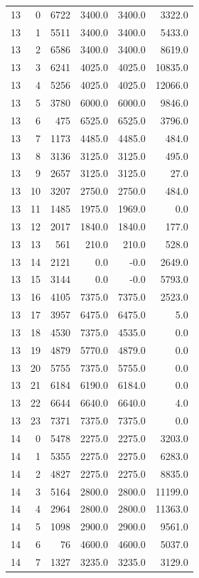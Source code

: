 \begin{longtable}{rrrrrr}
13 & 0 & 6722 & 3400.0 & 3400.0 & 3322.0\\
13 & 1 & 5511 & 3400.0 & 3400.0 & 5433.0\\
13 & 2 & 6586 & 3400.0 & 3400.0 & 8619.0\\
13 & 3 & 6241 & 4025.0 & 4025.0 & 10835.0\\
13 & 4 & 5256 & 4025.0 & 4025.0 & 12066.0\\
13 & 5 & 3780 & 6000.0 & 6000.0 & 9846.0\\
13 & 6 & 475 & 6525.0 & 6525.0 & 3796.0\\
13 & 7 & 1173 & 4485.0 & 4485.0 & 484.0\\
13 & 8 & 3136 & 3125.0 & 3125.0 & 495.0\\
13 & 9 & 2657 & 3125.0 & 3125.0 & 27.0\\
13 & 10 & 3207 & 2750.0 & 2750.0 & 484.0\\
13 & 11 & 1485 & 1975.0 & 1969.0 & 0.0\\
13 & 12 & 2017 & 1840.0 & 1840.0 & 177.0\\
13 & 13 & 561 & 210.0 & 210.0 & 528.0\\
13 & 14 & 2121 & 0.0 & -0.0 & 2649.0\\
13 & 15 & 3144 & 0.0 & -0.0 & 5793.0\\
13 & 16 & 4105 & 7375.0 & 7375.0 & 2523.0\\
13 & 17 & 3957 & 6475.0 & 6475.0 & 5.0\\
13 & 18 & 4530 & 7375.0 & 4535.0 & 0.0\\
13 & 19 & 4879 & 5770.0 & 4879.0 & 0.0\\
13 & 20 & 5755 & 7375.0 & 5755.0 & 0.0\\
13 & 21 & 6184 & 6190.0 & 6184.0 & 0.0\\
13 & 22 & 6644 & 6640.0 & 6640.0 & 4.0\\
13 & 23 & 7371 & 7375.0 & 7375.0 & 0.0\\
14 & 0 & 5478 & 2275.0 & 2275.0 & 3203.0\\
14 & 1 & 5355 & 2275.0 & 2275.0 & 6283.0\\
14 & 2 & 4827 & 2275.0 & 2275.0 & 8835.0\\
14 & 3 & 5164 & 2800.0 & 2800.0 & 11199.0\\
14 & 4 & 2964 & 2800.0 & 2800.0 & 11363.0\\
14 & 5 & 1098 & 2900.0 & 2900.0 & 9561.0\\
14 & 6 & 76 & 4600.0 & 4600.0 & 5037.0\\
14 & 7 & 1327 & 3235.0 & 3235.0 & 3129.0\\

\end{longtable}
